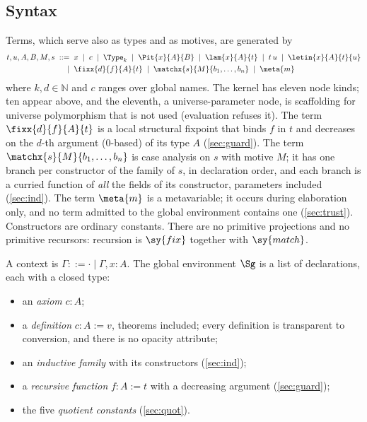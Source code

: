 \subsection{Syntax}\label{sec:syntax}

Terms, which serve also as types and as motives, are generated by
\begin{align*}
t,u,A,B,M,s \;::=\;\;
  & x \;\mid\; c \;\mid\; \Type_k \;\mid\; \Pit{x}{A}{B} \;\mid\; \lam{x}{A}{t} \;\mid\; t\,u \;\mid\; \letin{x}{A}{t}{u}\\
  \mid\;\; & \fixx{d}{f}{A}{t} \;\mid\; \matchx{s}{M}{b_1,\dots,b_n} \;\mid\; \meta{m}
\end{align*}
where $k,d\in\mathbb N$ and $c$ ranges over global names.
The kernel has eleven node kinds; ten appear above, and the eleventh, a universe-parameter node, is scaffolding for universe polymorphism that is not used (evaluation refuses it).
The term $\fixx{d}{f}{A}{t}$ is a local structural fixpoint that binds $f$ in $t$ and decreases on the $d$-th argument ($0$-based) of its type $A$ (\cref{sec:guard}).
The term $\matchx{s}{M}{b_1,\dots,b_n}$ is case analysis on $s$ with motive $M$; it has one branch per constructor of the family of $s$, in declaration order, and each branch is a curried function of \emph{all} the fields of its constructor, parameters included (\cref{sec:ind}).
The term $\meta{m}$ is a metavariable; it occurs during elaboration only, and no term admitted to the global environment contains one (\cref{sec:trust}).
Constructors are ordinary constants.
There are no primitive projections and no primitive recursors: recursion is $\sy{fix}$ together with $\sy{match}$.

A context is $\Gamma ::= \cdot \mid \Gamma, x{:}A$.
The global environment $\Sg$ is a list of declarations, each with a closed type:
\begin{itemize}
\item an \emph{axiom} $c : A$;
\item a \emph{definition} $c : A \mathrel{:=} v$, theorems included;
  every definition is transparent to conversion, and there is no opacity attribute;
\item an \emph{inductive family} with its constructors (\cref{sec:ind});
\item a \emph{recursive function} $f : A \mathrel{:=} t$ with a decreasing argument (\cref{sec:guard});
\item the five \emph{quotient constants} (\cref{sec:quot}).
\end{itemize}

